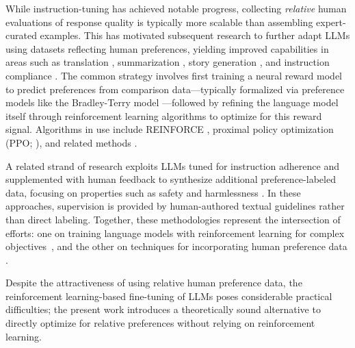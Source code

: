 While instruction-tuning has achieved notable progress, collecting \textit{relative} human evaluations of response quality is typically more scalable than assembling expert-curated examples. This has motivated subsequent research to further adapt LLMs using datasets reflecting human preferences, yielding improved capabilities in areas such as translation \citep{kreutzer-etal-2018-reliability}, summarization \citep{stiennon2022learning,ziegler2020finetuning}, story generation \citep{ziegler2020finetuning}, and instruction compliance \citep{ouyang2022training,ramamurthy2023is}. The common strategy involves first training a neural reward model to predict preferences from comparison data—typically formalized via preference models like the Bradley-Terry model \citep{bradley1952rankanalysis}—followed by refining the language model itself through reinforcement learning algorithms to optimize for this reward signal. Algorithms in use include REINFORCE \citep{williams1992reinforce}, proximal policy optimization (PPO; \cite{schulman2017proximal}), and related methods \citep{ramamurthy2023is}.

A related strand of research exploits LLMs tuned for instruction adherence and supplemented with human feedback to synthesize additional preference-labeled data, focusing on properties such as safety and harmlessness \citep{bai2022constitutional}. In these approaches, supervision is provided by human-authored textual guidelines rather than direct labeling. Together, these methodologies represent the intersection of efforts: one on training language models with reinforcement learning for complex objectives~\citep{Ranzato2015SequenceLT,paulus2018a,wu2018learning}, and the other on techniques for incorporating human preference data \citep{christiano2017deep,kupcsik2018learning}. 

Despite the attractiveness of using relative human preference data, the reinforcement learning-based fine-tuning of LLMs poses considerable practical difficulties; the present work introduces a theoretically sound alternative to directly optimize for relative preferences without relying on reinforcement learning.

